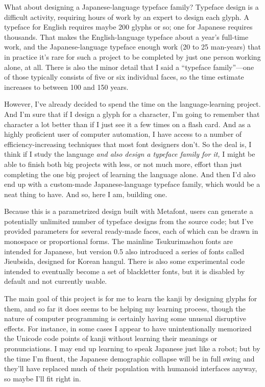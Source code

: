 \documentclass[14pt]{extarticle}
\begin{document}
What about designing a Japanese-language typeface family?  Typeface design
is a difficult activity, requiring hours of work by an expert to design each
glyph.  A typeface for English requires maybe 200 glyphs or so; one for
Japanese requires thousands.  That makes the English-language typeface about
a year's full-time work, and the Japanese-language typeface enough work (20
to 25 man-years) that in practice it's rare for such a project to be
completed by just one person working alone, at all.  There is also the minor
detail that I said a ``typeface family''---one of those typically consists
of five or six individual faces, so the time estimate increases to between
100 and 150 years.

However, I've already decided to spend the time on the language-learning
project.  And I'm sure that if I design a glyph for a character, I'm going
to remember that character a lot better than if I just see it a few times on
a flash card.  And as a highly proficient user of computer automation, I
have access to a number of efficiency-increasing techniques that most font
designers don't.  So the deal is, I think if I study the language
\emph{and also design a typeface family for it,} I might be able to
finish both big projects with less, or not much more, effort than just
completing the one big project of learning the language alone.  And then I'd
also end up with a custom-made Japanese-language typeface family, which
would be a neat thing to have.  And so, here I am, building one.

Because this is a parametrized design built with Metafont, users can
generate a potentially unlimited number of typeface designs from the source
code; but I've provided parameters for several ready-made faces, each of
which can be drawn in monospace or proportional forms.  The mainline
Tsukurimashou fonts are intended for Japanese, but version 0.5 also
introduced a series of fonts called Jieubsida, designed for Korean
hangul.  There is also some experimental code intended to eventually become
a set of blackletter fonts, but it is disabled by default and not currently
usable.

The main goal of this project is for me to learn the kanji by designing
glyphs for them, and so far it does seems to be helping my learning process,
though the nature of computer programming is certainly having some unusual
disruptive effects.  For instance, in some cases I appear to have
unintentionally memorized the Unicode code points of kanji without learning
their meanings or pronunciations.  I may end up learning to speak Japanese
just like a robot; but by the time I'm fluent, the Japanese demographic
collapse will be in full swing and they'll have replaced much of their
population with humanoid interfaces anyway, so maybe I'll fit right in.
\end{document}
